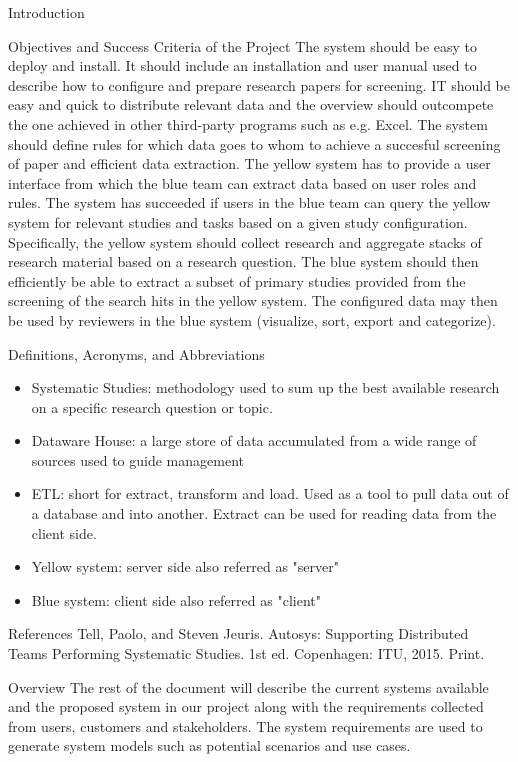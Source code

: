 \begin{section}{Introduction}
\begin{subsection}{Objectives and Success Criteria of the Project}
The system should be easy to deploy and install. It should include an installation and user manual used to describe how to configure and prepare research papers for screening. IT should be easy and quick to distribute relevant data and the overview should outcompete the one achieved in other third-party programs such as e.g. Excel. The system should define rules for which data goes to whom to achieve a succesful screening of paper and efficient data extraction. The yellow system has to provide a user interface from which the blue team can extract data based on user roles and rules. The system has succeeded if users in the blue team can query the yellow system for relevant studies and tasks based on a given study configuration. Specifically, the yellow system should collect research and aggregate stacks of research material based on a research question. The blue system should then efficiently be able to extract a subset of primary studies provided from the screening of the search hits in the yellow system. The configured data may then be used by reviewers in the blue system (visualize, sort, export and categorize).

\end{subsection}


\begin{subsection}{Definitions, Acronyms, and Abbreviations}
	\begin{itemize}
	  \item Systematic Studies: methodology used to sum up the best available research on a specific research question or topic.  
	  \item Dataware House: a large store of data accumulated from a wide range of sources used to guide management 
	  \item ETL: short for extract, transform and load. Used as a tool to pull data out of a database and into another. Extract can be used for reading data from the client side. 
	  \item Yellow system: server side also referred as "server"
	\item Blue system: client side also referred as "client" 
	\end{itemize}

\end{subsection}

\begin{subsection}{References}
Tell, Paolo, and Steven Jeuris. Autosys: Supporting Distributed Teams Performing Systematic Studies. 1st ed. Copenhagen: ITU, 2015. Print.
\end{subsection}

\begin{subsection}{Overview}
The rest of the document will describe the current systems available and the proposed system in our project along with the requirements collected from users, customers and stakeholders. The system requirements are used to generate system models such as potential scenarios and use cases. 
\end{subsection}

\end{section}
